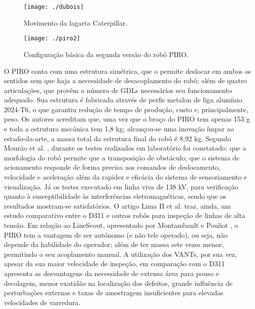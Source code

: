 \begin{figure} [h!]	
	\caption{Movimento da lagarta Caterpillar.}
	\label{img:dubois}											 
	\centering													 
	\texttt{[image: ./dubois]}
\end{figure}													 

\begin{figure} [h!]	
	\caption{Configuração básica da segunda versão do robô PIRO.}
	\label{img:piro2}											 
	\centering													 
	\texttt{[image: ./piro2]}
\end{figure}													 

O PIRO conta com uma estrutura simétrica, que o permite deslocar em ambos os sentidos sem que haja a necessidade de desacoplamento do robô; além de quatro articulações, que provém o número de GDLs necessários seu funcionamento adequado. Sua estrutura é fabricada através de perfis metalon de liga alumínio 2024-T6, o que garantiu redução de tempo de produção, custo e, principalmente, peso. Os autores acreditam que, uma vez que o braço do PIRO tem apenas 153 g e toda a estrutura mecânica tem 1,8 kg; alcançou-se uma inovação ímpar ao estado-da-arte, a massa total da estrutura final do robô é 8,92 kg.
Segundo Mourão et al. \cite{mourao2015robolinhas}, durante os testes realizados em laboratório foi constatado: que a morfologia do robô permite que a transposição de obstáculo; que o sistema de acionamento responde de forma precisa aos comandos de deslocamento, velocidade e aceleração além da rapidez e eficácia do sistema de sensoriamento e visualização. Já os testes executado em linha viva de 138 kV, para verificação quanto à susceptibilidade às interferências eletromagnéticas, sendo que os resultados mostram-se satisfatórios. 
O artigo Lima II et al. \cite{iirobo} traz, ainda, um estudo comparativo entre o D311 e outros robôs para inspeção de linhas de alta tensão. Em relação ao LineScout, apresentado por Montambault e Pouliot \cite{montambault2007design} , o PIRO tem a vantagem de ser autônomo (e não tele operado), ou seja, não depende da habilidade do operador; além de ter massa sete vezes menor, permitindo o seu acoplamento manual. A utilização dos VANTs, por sua vez, apesar da sua maior velocidade de inspeção, em comparação com o D311 apresenta as desvantagens da necessidade de extensa área para pouso e decolagem, menor exatidão na localização dos defeitos, grande influência de perturbações externas e taxas de amostragem insuficientes para elevadas velocidades de varredura.

